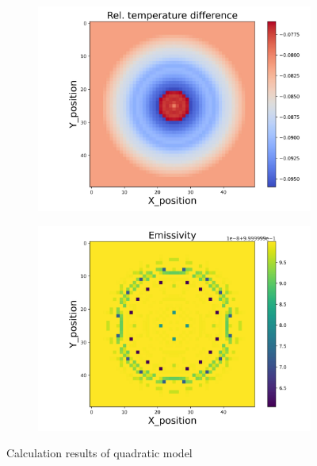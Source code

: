 \begin{figure}[htbp]
    \begin{minipage}{\textwidth}
        \centering
        \begin{subfigure}{0.49\textwidth}
            \centering
            \includegraphics[width=\textwidth]{figures/raw_data/5/quad/T_bias.jpg}
        \end{subfigure}
        \begin{subfigure}{0.49\textwidth}
            \centering
            \includegraphics[width=\textwidth]{figures/raw_data/5/quad/emi_cal.jpg}
        \end{subfigure}
    \end{minipage}
    \caption{Calculation results of quadratic model}
    \label{fig: result_quadratic_model}
\end{figure}


